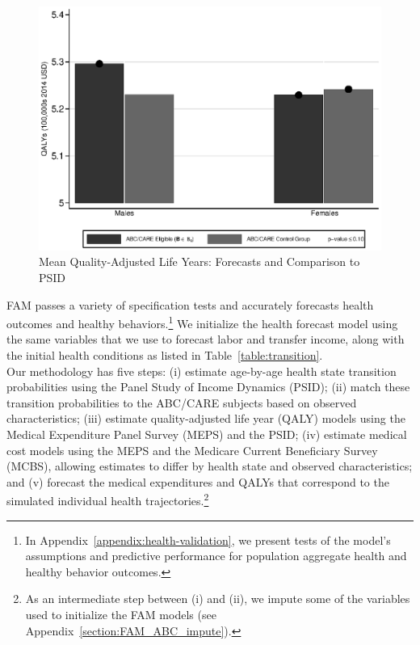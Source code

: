 \begin{figure}[!htbp]
\caption{Mean Quality-Adjusted Life Years: Forecasts and Comparison to PSID}\label{fig:qalys}
\centering
\includegraphics[width=.7\columnwidth]{output/qalyexppsid.eps}
\end{figure}

\noindent FAM passes a variety of specification tests and accurately forecasts health outcomes and healthy behaviors.\footnote{In Appendix~\ref{appendix:health-validation}, we present tests of the model's assumptions and predictive performance for population aggregate health and healthy behavior outcomes.} We initialize the health forecast model using the same variables that we use to forecast labor and transfer income, along with the initial health conditions as listed in Table~\ref{table:transition}.\\

\noindent Our methodology has five steps: (i) estimate age-by-age health state transition probabilities using the Panel Study of Income Dynamics (PSID); (ii) match these transition probabilities to the ABC/CARE subjects based on observed characteristics; (iii) estimate quality-adjusted life year (QALY) models using the Medical Expenditure Panel Survey (MEPS) and the PSID; (iv) estimate medical cost models using the MEPS and the Medicare Current Beneficiary Survey (MCBS), allowing estimates to differ by health state and observed characteristics; and (v) forecast the medical expenditures and QALYs that correspond to the simulated individual health trajectories.\footnote{As an intermediate step between (i) and (ii), we impute some of the variables used to initialize the FAM models (see  Appendix~\ref{section:FAM_ABC_impute}).}\\


